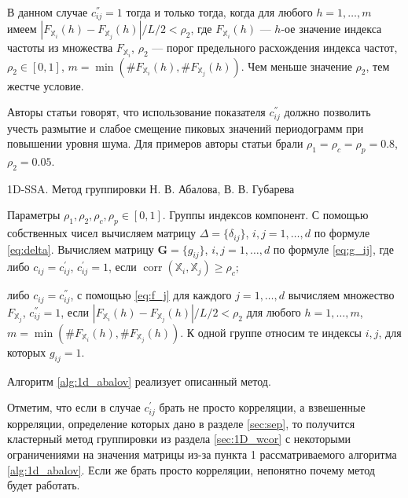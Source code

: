 \documentclass[specialist,
               substylefile = spbu.rtx,
               subf,href,colorlinks=true, 12pt]{disser}
\def\corr{\mathop{\mathrm{corr}}}
\begin{document}
В данном случае $c^{''}_{ij}=1$ тогда и только тогда, когда для любого $h=1,\ldots,m$ имеем $|F_{\mathbb{X}_i}(h) - F_{\mathbb{X}_j}(h)|/ L/2 < \rho_2$, где $F_{\mathbb{X}_i}(h)$ --- $h$-ое значение индекса частоты из множества $F_{\mathbb{X}_i}$, $\rho_2$ --- порог предельного расхождения индекса частот,  $\rho_2 \in [0,1]$, $m = \min\left(\#F_{\mathbb{X}_i}(h), \#F_{\mathbb{X}_j}(h) \right)$. Чем меньше значение $\rho_2$, тем жестче условие.

Авторы статьи говорят, что использование показателя $c^{''}_{ij}$ должно позволить
учесть размытие и слабое смещение пиковых значений периодограмм при повышении уровня шума.
Для примеров авторы статьи брали $\rho_1 =\rho_c =\rho_p = 0.8$, $\rho_2 = 0.05$.

\begin{algorithm}[!hhh]
\caption{1D-SSA. Метод группировки Н. В. Абалова, В. В. Губарева}
\label{alg:1d_abalov}
\begin{algorithmic}[1]
\REQUIRE Параметры $\rho_1, \rho_2, \rho_c, \rho_p  \in [0,1]$.
\ENSURE Группы индексов компонент.
\STATE  С помощью собственных чисел вычисляем матрицу $\Delta = \{\delta_{ij}\}$, $i,j=1,\ldots,d$ по формуле \eqref{eq:delta}.
\STATE Вычисляем матрицу $\mathbf{G}=\{g_{ij}\}$, $i,j = 1,\ldots,d$ по формуле \eqref{eq:g_ij}, где\\
либо $c_{ij} = c_{ij}^{'}$, $c_{ij}^{'} = 1$, если  $\corr(\mathbb{X}_i, \mathbb{X}_j) \geqslant \rho_c$;

либо $c_{ij} = c_{ij}^{''}$, с помощью \eqref{eq:f_j} для каждого $j = 1,\ldots, d$ вычисляем множество $F_{\mathbb{X}_j}$, $c_{ij}^{''} = 1$, если $|F_{\mathbb{X}_i}(h) - F_{\mathbb{X}_j}(h)|/ L/2 < \rho_2$ для любого $h=1,\ldots,m$, $m = \min\left(\#F_{\mathbb{X}_i}(h), \#F_{\mathbb{X}_j}(h) \right)$.
\STATE К одной группе относим те индексы $i,j$, для которых $g_{ij} = 1$.
\end{algorithmic}
\end{algorithm}

Алгоритм \ref{alg:1d_abalov} реализует описанный метод.

Отметим, что если в случае $c_{ij}^{'}$ брать не просто корреляции, а взвешенные корреляции, определение которых дано в разделе \ref{sec:sep}, то получится кластерный метод группировки из раздела \ref{sec:1D_wcor} с некоторыми ограничениями на значения матрицы из-за пункта 1 рассматриваемого алгоритма \ref{alg:1d_abalov}. Если же брать просто корреляции, непонятно почему метод будет работать.
\end{document}
